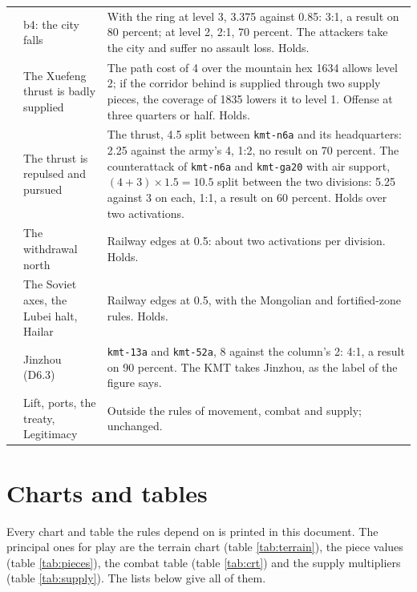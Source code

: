 \documentclass[11pt]{article}
\begin{document}
{\begin{longtable}{@{}>{\raggedright\arraybackslash}p{}>{\raggedright\arraybackslash}p{}>{\raggedright\arraybackslash}p{}@{}}
3 & b4: the city falls & With the ring at level 3, 3.375 against 0.85: 3:1, a result on 80 percent; at level 2, 2:1, 70 percent. The attackers take the city and suffer no assault loss. Holds. \\
4 & The Xuefeng thrust is badly supplied & The path cost of 4 over the mountain hex 1634 allows level 2; if the corridor behind is supplied through two supply pieces, the coverage of 1835 lowers it to level 1. Offense at three quarters or half. Holds. \\
4 & The thrust is repulsed and pursued & The thrust, 4.5 split between \texttt{kmt-n6a} and its headquarters: 2.25 against the army's 4, 1:2, no result on 70 percent. The counterattack of \texttt{kmt-n6a} and \texttt{kmt-ga20} with air support, $(4+3)\times 1.5=10.5$ split between the two divisions: 5.25 against 3 on each, 1:1, a result on 60 percent. Holds over two activations. \\
4 & The withdrawal north & Railway edges at 0.5: about two activations per division. Holds. \\
5 & The Soviet axes, the Lubei halt, Hailar & Railway edges at 0.5, with the Mongolian and fortified-zone rules. Holds. \\
6 & Jinzhou (D6.3) & \texttt{kmt-13a} and \texttt{kmt-52a}, 8 against the column's 2: 4:1, a result on 90 percent. The KMT takes Jinzhou, as the label of the figure says. \\
6 & Lift, ports, the treaty, Legitimacy & Outside the rules of movement, combat and supply; unchanged. \\
\end{longtable}
}

\section{Charts and tables}\label{sec:charts}
Every chart and table the rules depend on is printed in this document. The principal ones for play are the terrain chart (table \ref{tab:terrain}), the piece values (table \ref{tab:pieces}), the combat table (table \ref{tab:crt}) and the supply multipliers (table \ref{tab:supply}). The lists below give all of them.
\begingroup\small
\renewcommand{\listtablename}{Tables}\renewcommand{\listfigurename}{Figures}
\listoftables
\listoffigures
\endgroup
\end{document}

